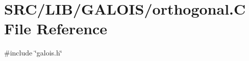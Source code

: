 \hypertarget{_l_i_b_2_g_a_l_o_i_s_2orthogonal_8_c}{}\section{S\+R\+C/\+L\+I\+B/\+G\+A\+L\+O\+I\+S/orthogonal.C File Reference}
\label{_l_i_b_2_g_a_l_o_i_s_2orthogonal_8_c}
{\ttfamily \#include \char`\"{}galois.\+h\char`\"{}}\newline
